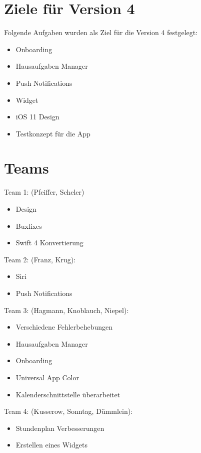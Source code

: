 \section{Ziele für Version 4}
Folgende Aufgaben wurden als Ziel für die Version 4 festgelegt:
\begin{itemize}
\item Onboarding
\item Hausaufgaben Manager
\item Push Notifications
\item Widget
\item iOS 11 Design
\item Testkonzept für die App
\end{itemize}


\section{Teams}

Team 1: (Pfeiffer, Scheler)
\begin{itemize}
\item Design
\item Buxfixes
\item Swift 4 Konvertierung
\end{itemize}


Team 2: (Franz, Krug):
\begin{itemize}
\item Siri
\item Push Notifications
\end{itemize}


Team 3: (Hagmann, Knoblauch, Niepel):
\begin{itemize}
\item Verschiedene Fehlerbehebungen
\item Hausaufgaben Manager
\item Onboarding 
\item Universal App Color
\item Kalenderschnittstelle überarbeitet
\end{itemize}


Team 4: (Kusserow, Sonntag, Dümmlein):
\begin{itemize}
\item Stundenplan Verbesserungen


\item Erstellen eines Widgets
\end{itemize}


